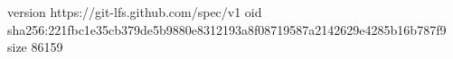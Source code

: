 version https://git-lfs.github.com/spec/v1
oid sha256:221fbc1e35cb379de5b9880e8312193a8f08719587a2142629e4285b16b787f9
size 86159
